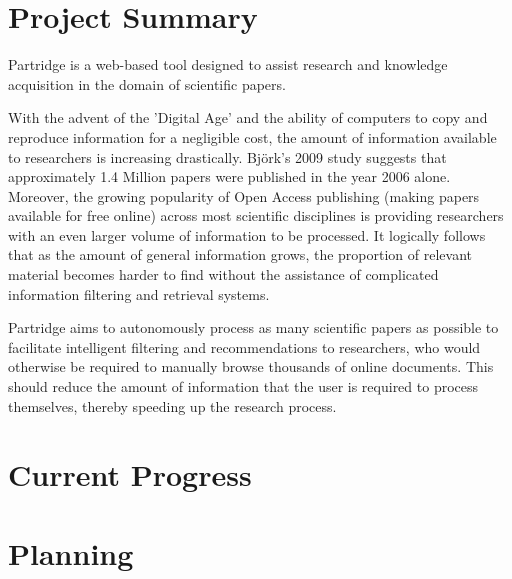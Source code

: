 \documentclass[12pt,a4paper]{article}
\begin{document}



\setlength{\parindent}{0pt}
\setlength{\parskip}{1.5ex plus 0.5ex minus 0.2ex}

\tableofcontents

\pagebreak

\section{Project Summary}
Partridge is a web-based tool designed to assist research and knowledge
acquisition in the domain of scientific papers.

With the advent of the 'Digital Age' and the ability of computers to copy and
reproduce information for a negligible cost, the amount of information
available to researchers is increasing drastically.  Bj\"{o}rk's 2009 study
suggests that approximately 1.4 Million papers were published in the year 2006
alone\cite{bjork2009}. Moreover, the growing popularity of Open Access
publishing (making papers available for free online\cite{Suber2012}) across
most scientific disciplines is providing researchers with an even larger volume
of information to be processed. It logically follows that as the amount of
general information grows, the proportion of relevant material becomes harder
to find without the assistance of complicated information filtering and retrieval
systems.

Partridge aims to autonomously process as many scientific papers as
possible to facilitate intelligent filtering and recommendations to
researchers, who would otherwise be required to manually browse thousands of
online documents. This should reduce the amount of information that the user is
required to process themselves, thereby speeding up the research process.

\section{Current Progress}

\section{Planning}

\renewcommand{\refname}{Initial Bibliography} 


\end{document}

